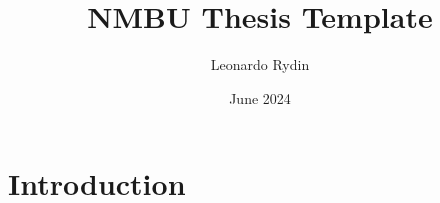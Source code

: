 \documentclass{article}
\title{NMBU Thesis Template}
\author{Leonardo Rydin}
\date{June 2024}
\begin{document}
\maketitle

\section{Introduction}
\end{document}
